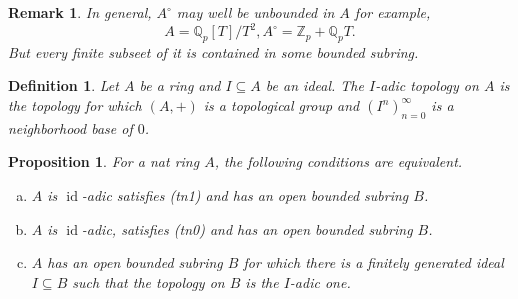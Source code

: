 \documentclass[8pt]{article}
\numberwithin{equation}{section}
\newtheorem{proposition}{Proposition}[subsection]
\newtheorem{definition}{Definition}[subsection]
\newtheorem{remark}{Remark}[subsection]
\DeclareMathOperator{\id}{id}
\newcommand{\Z}[0]{\mathbb{Z}}
\newcommand{\Q}[0]{\mathbb{Q}}
\begin{document}
\begin{remark}
    \label{remark_17_2}
    In general, $A^\circ$ may well be unbounded in $A$ for example,
    \begin{equation*}
        A=\Q_p[T]/T^2,A^\circ = \Z_p+\Q_pT.
    \end{equation*}
    But every finite subseet of it is contained in some bounded subring.
\end{remark}

\begin{definition}
    \label{definition_17_2}
    Let $A$ be a ring and $I\subseteq A$ be an ideal. The $I$-adic topology on $A$ is the topology for which $(A,+)$ is a topological group and $(I^n)_{n=0}^\infty$ is a neighborhood base of $0$.
\end{definition}

\begin{proposition}
    \label{proposition_17_2}
    For a nat ring $A$, the following conditions are equivalent.
    \begin{enumerate}[a.]
        \item $A$ is $\id$-adic satisfies (tn1) and has an open bounded subring $B$.
        \item $A$ is $\id$-adic, satisfies (tn0) and has an open bounded subring $B$.
        \item $A$ has an open bounded subring $B$ for which there is a finitely generated ideal $I\subseteq B$ such that the topology on $B$ is the $I$-adic one.
    \end{enumerate}
\end{proposition}
\end{document}
